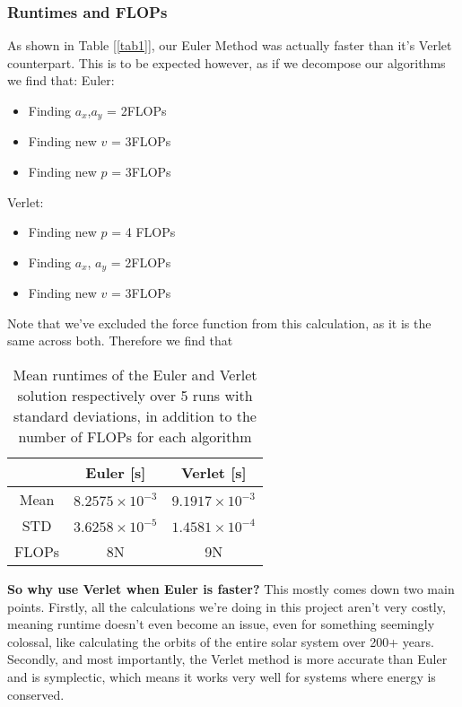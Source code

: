 \documentclass{article}
\begin{document}
\subsubsection*{Runtimes and FLOPs}
As shown in Table [\ref{tab1}], our Euler Method was actually faster than it's Verlet counterpart. This is to be expected however, as if we decompose our algorithms we find that: \newline
Euler:
\begin{itemize}
    \item Finding $a_x$,$a_y$ = 2FLOPs
    \item Finding new $v$ = 3FLOPs
    \item Finding new $p$ = 3FLOPs
\end{itemize}
Verlet:
\begin{itemize}
    \item Finding new $p$ = 4 FLOPs
    \item Finding $a_x$, $a_y$ = 2FLOPs
    \item Finding new $v$ = 3FLOPs
\end{itemize}
Note that we've excluded the force function from this calculation, as it is the same across both.
\newline Therefore we find that
\begin{table}[ht!]
\centering
 \begin{tabular}{||c c c ||}
 \hline
 
  &  Euler [s] & Verlet [s] \\ [0.5ex] 
 \hline
 \hline
 Mean &  $8.2575\times 10^{-3}$ & $9.1917\times 10^{-3}$ \\ 
 \hline
 STD &  $3.6258\times 10^{-5}$ & $1.4581\times 10^{-4}$ \\
 \hline
 FLOPs & 8N & 9N \\
 \hline
 \hline
 
\end{tabular}
\caption{Mean runtimes of the Euler and Verlet solution respectively over 5 runs with standard deviations, in addition to the number of FLOPs for each algorithm}
\label{tab2}
\end{table}
\newline \textbf{So why use Verlet when Euler is faster?} \newline
This mostly comes down two main points. Firstly, all the calculations we're doing in this project aren't very costly, meaning runtime doesn't even become an issue, even for something seemingly colossal, like calculating the orbits of the entire solar system over 200+ years. \newline
Secondly, and most importantly, the Verlet method is more accurate than Euler and is symplectic, which means it works very well for systems where energy is conserved. \newpage
\end{document}
